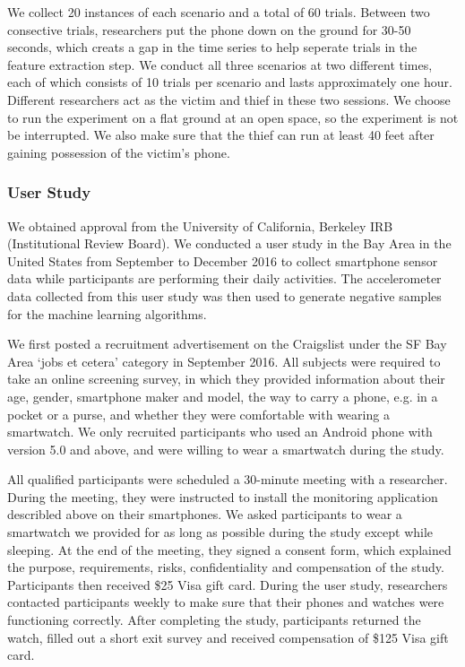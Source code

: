 \documentclass{soups}
\begin{document}
We collect 20 instances of each scenario and a total of 60 trials. 
Between two consective trials, researchers put the phone down on the ground for 30-50 seconds, which creats a gap in the time series to help seperate trials in the feature extraction step. 
We conduct all three scenarios at two different times, each of which consists of 10 trials per scenario and lasts approximately one hour. Different researchers act as the victim and thief in these two sessions. 
We choose to run the experiment on a flat ground at an open space, so the experiment is not be interrupted. 
We also make sure that the thief can run at least 40 feet after gaining possession of the victim's phone.



\subsubsection{User Study}
We obtained approval from the University of California, Berkeley IRB (Institutional Review Board). 
We conducted a user study in the Bay Area in the United States from September to December 2016 to collect smartphone sensor data while participants are performing their daily activities. 
The accelerometer data collected from this user study was then used to generate negative samples for the machine learning algorithms.

We first posted a recruitment advertisement on the Craigslist under the SF Bay Area `jobs et cetera' category in September 2016. 
All subjects were required to take an online screening survey, in which they provided information about their age, gender, smartphone maker and model, the way to carry a phone, e.g. in a pocket or a purse, and whether they were comfortable with wearing a smartwatch. 
We only recruited participants who used an Android phone with version 5.0 and above, and were willing to wear a smartwatch during the study.

All qualified participants were scheduled a 30-minute meeting with a researcher. 
During the meeting, they were instructed to install the monitoring application describled above on their smartphones. 
We asked participants to wear a smartwatch we provided for as long as possible during the study except while sleeping. 
At the end of the meeting, they signed a consent form, which explained the purpose, requirements, risks, confidentiality and compensation of the study. Participants then received \$25 Visa gift card. 
During the user study, researchers contacted participants weekly to make sure that their phones and watches were functioning correctly. 
After completing the study, participants returned the watch, filled out a short exit survey and received compensation of \$125 Visa gift card.
\end{document}
